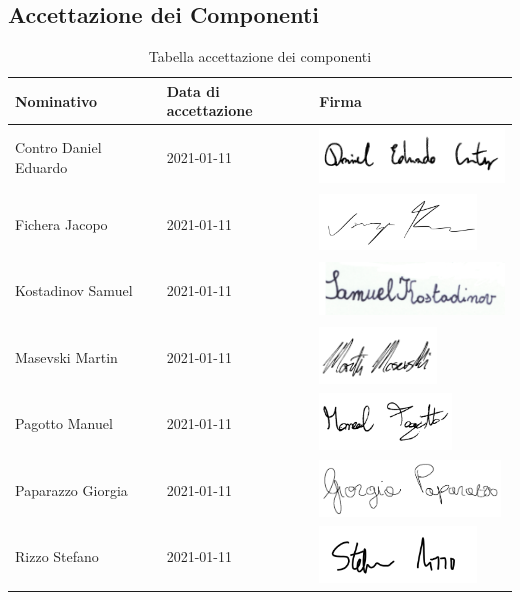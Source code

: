 \documentclass[../piano_di_progetto.tex]{subfiles}
\begin{document}
\subsection{Accettazione dei Componenti}%
\label{sub:acc_comp}


\begin{table}[!ht]
	\centering
	\begin{tabular}{|l|l|l|}
		\hline
		\rowcolor{lightgray}
		\textbf{Nominativo} & \textbf{Data di accettazione} & \textbf{Firma} \\ 
		\hline
		Contro Daniel Eduardo & 2021-01-11 & \includegraphics[height=1.5cm]{componenti/img/firma_dec} \\ 
		\hline
		Fichera Jacopo & 2021-01-11 & \includegraphics[height=1.5cm]{componenti/img/firma_jf} \\ 
		\hline
		Kostadinov Samuel & 2021-01-11 & \includegraphics[height=1.5cm]{componenti/img/firma_sk} \\
		\hline
		Masevski Martin & 2021-01-11 & \includegraphics[height=1.5cm]{componenti/img/firma_mm} \\ 
		\hline
		Pagotto Manuel & 2021-01-11 & \includegraphics[height=1.5cm]{componenti/img/firma_mp}  \\ 
		\hline
		Paparazzo Giorgia & 2021-01-11 & \includegraphics[height=1.5cm]{componenti/img/firma_gp} \\
		\hline
		Rizzo Stefano & 2021-01-11 & \includegraphics[height=1.5cm]{componenti/img/firma_sr}  \\ 
		\hline

	\end{tabular}
		\caption{Tabella accettazione dei componenti}
\end{table}
\end{document}
